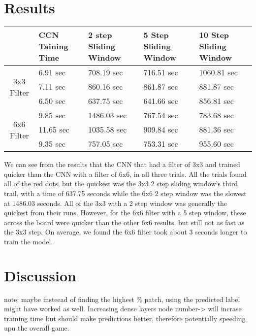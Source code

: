 \documentclass[a4paper,10pt]{article}
\begin{document}

\section{Results}
\begin{center}
	\begin{tabular}{ |c|p{1.5cm}|p{2.25cm}|p{2.25cm}|p{2.25cm}| } 
		\hline
		 & CCN Taining Time & 2 step Sliding Window & 5 Step Sliding Window & 10 Step Sliding Window \\
		\hline
		\multirow{3}{4em}{3x3 Filter} & 6.91 sec & 708.19 sec & 716.51 sec & 1060.81 sec \\ 
		
		& 7.11 sec & 860.16 sec & 861.87 sec & 881.87 sec  \\ 
		& 6.50 sec & 637.75 sec & 641.66 sec & 856.81 sec \\ 
		\hline
		\multirow{3}{4em}{6x6 Filter} & 9.85 sec & 1486.03 sec & 767.54 sec & 783.68 sec \\ 
		& 11.65 sec & 1035.58 sec & 909.84 sec & 881.36 sec \\ 
		& 9.35 sec & 757.05 sec & 753.31 sec & 955.60 sec \\ 
		\hline
	\end{tabular}
\end{center}

We can see from the results that the CNN that had a filter of 3x3 and trained quicker than the CNN with a filter of 6x6, in all three trials. All the trials found all of the red dots, but the quickest was the 3x3 2 step sliding window's third trail, with a time of 637.75 seconds while the 6x6 2 step window was the slowest at 1486.03 seconds. All of the 3x3 with a 2 step window was generally the quickest from their runs. However, for the 6x6 filter with a 5 step window, these across the board were quicker than the other 6x6 results, but still not as fast as the 3x3 step. On average, we found the 6x6 filter took about 3 seconds longer to train the model.

\section{Discussion}
note: maybe insteead of finding the highest \% patch, using the predicted label might have worked as well.
Increasing dense layers node number-> will incrase training time but should make predictions better, therefore potentially speeding upu the overall game.
\end{document}
